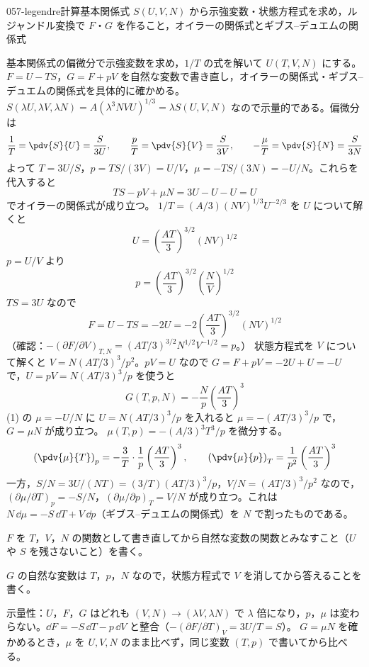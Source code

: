 \documentclass[uplatex,dvipdfmx,a4paper,11pt]{jsarticle}
\begin{document}
\begin{mondai}{057-legendre}{計算}{基本関係式 $S(U,V,N)$ から示強変数・状態方程式を求め，ルジャンドル変換で $F$・$G$ を作ること，オイラーの関係式とギブス--デュエムの関係式}
\begin{kizuki}
\end{kizuki}
\begin{tadashii}
\houshin 基本関係式の偏微分で示強変数を求め，$1/T$ の式を解いて $U(T,V,N)$ にする。$F=U-TS$，$G=F+pV$ を自然な変数で書き直し，オイラーの関係式・ギブス--デュエムの関係式を具体的に確かめる。
\keisan {} $S(\lambda U,\lambda V,\lambda N)=A(\lambda^{3}NVU)^{1/3}=\lambda S(U,V,N)$ なので示量的である。偏微分は
\[ \frac{1}{T}=\pdv{S}{U}=\frac{S}{3U},\qquad \frac{p}{T}=\pdv{S}{V}=\frac{S}{3V},\qquad -\frac{\mu}{T}=\pdv{S}{N}=\frac{S}{3N} \]
よって $T=3U/S$，$p=TS/(3V)=U/V$，$\mu=-TS/(3N)=-U/N$。これらを代入すると
\[ TS-pV+\mu N=3U-U-U=U \]
でオイラーの関係式が成り立つ。
 $1/T=(A/3)(NV)^{1/3}U^{-2/3}$ を $U$ について解くと
\[ U=\left(\frac{AT}{3}\right)^{3/2}(NV)^{1/2} \]
$p=U/V$ より
\[ p=\left(\frac{AT}{3}\right)^{3/2}\left(\frac{N}{V}\right)^{1/2} \]
$TS=3U$ なので
\[ F=U-TS=-2U=-2\left(\frac{AT}{3}\right)^{3/2}(NV)^{1/2} \]
（確認：$-(\partial F/\partial V)_{T,N}=(AT/3)^{3/2}N^{1/2}V^{-1/2}=p$。）
 状態方程式を $V$ について解くと $V=N(AT/3)^{3}/p^{2}$。$pV=U$ なので $G=F+pV=-2U+U=-U$ で，$U=pV=N(AT/3)^{3}/p$ を使うと
\[ G(T,p,N)=-\frac{N}{p}\left(\frac{AT}{3}\right)^{3} \]
(1) の $\mu=-U/N$ に $U=N(AT/3)^{3}/p$ を入れると $\mu=-(AT/3)^{3}/p$ で，$G=\mu N$ が成り立つ。
 $\mu(T,p)=-(A/3)^{3}T^{3}/p$ を微分する。
\[ \left(\pdv{\mu}{T}\right)_{p}=-\frac{3}{T}\cdot\frac{1}{p}\left(\frac{AT}{3}\right)^{3},\qquad \left(\pdv{\mu}{p}\right)_{T}=\frac{1}{p^{2}}\left(\frac{AT}{3}\right)^{3} \]
一方，$S/N=3U/(NT)=(3/T)(AT/3)^{3}/p$，$V/N=(AT/3)^{3}/p^{2}$ なので，$(\partial\mu/\partial T)_{p}=-S/N$，$(\partial\mu/\partial p)_{T}=V/N$ が成り立つ。これは $N\,\dd\mu=-S\,\dd T+V\,\dd p$（ギブス--デュエムの関係式）を $N$ で割ったものである。
\begin{ronten}
  \item {} $F$ を $T$，$V$，$N$ の関数として書き直してから自然な変数の関数とみなすこと（$U$ や $S$ を残さないこと）を書く。
  \item {} $G$ の自然な変数は $T$，$p$，$N$ なので，状態方程式で $V$ を消してから答えることを書く。
\end{ronten}
\kenzan 示量性：$U$，$F$，$G$ はどれも $(V,N)\to(\lambda V,\lambda N)$ で $\lambda$ 倍になり，$p$，$\mu$ は変わらない。$\dd F=-S\,\dd T-p\,\dd V$ と整合（$-(\partial F/\partial T)_{V}=3U/T=S$）。
\tsumazuki $G=\mu N$ を確かめるとき，$\mu$ を $U,V,N$ のまま比べず，同じ変数 $(T,p)$ で書いてから比べる。
\end{tadashii}
\end{mondai}

\noteowari
\end{document}
